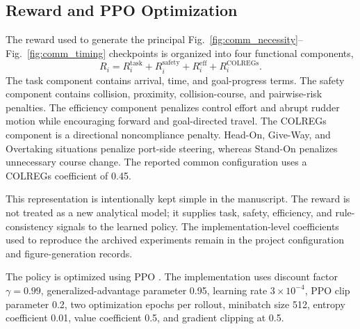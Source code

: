 \documentclass[final,5p,times,twocolumn]{elsarticle}
\begin{document}
\subsection{Reward and PPO Optimization}
\label{sec:training}
{\color{red}
The reward used to generate the principal Fig.~\ref{fig:comm_necessity}--Fig.~\ref{fig:comm_timing} checkpoints is organized into four functional components,
\begin{equation}
R_i=R_i^{\mathrm{task}}+R_i^{\mathrm{safety}}+R_i^{\mathrm{eff}}+R_i^{\mathrm{COLREGs}}.
\label{eq:reward_groups}
\end{equation}
The task component contains arrival, time, and goal-progress terms. The safety component contains collision, proximity, collision-course, and pairwise-risk penalties. The efficiency component penalizes control effort and abrupt rudder motion while encouraging forward and goal-directed travel. The COLREGs component is a directional noncompliance penalty. Head-On, Give-Way, and Overtaking situations penalize port-side steering, whereas Stand-On penalizes unnecessary course change. The reported common configuration uses a COLREGs coefficient of 0.45.

This representation is intentionally kept simple in the manuscript. The reward is not treated as a new analytical model; it supplies task, safety, efficiency, and rule-consistency signals to the learned policy. The implementation-level coefficients used to reproduce the archived experiments remain in the project configuration and figure-generation records.

The policy is optimized using PPO \citep{PPO}. The implementation uses discount factor $\gamma=0.99$, generalized-advantage parameter 0.95, learning rate $3\times10^{-4}$, PPO clip parameter 0.2, two optimization epochs per rollout, minibatch size 512, entropy coefficient 0.01, value coefficient 0.5, and gradient clipping at 0.5.
}

\end{document}
